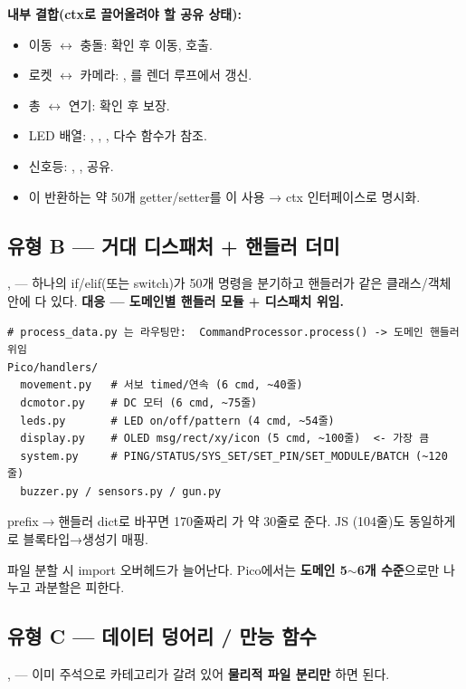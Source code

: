 \noindent\textbf{내부 결합(ctx로 끌어올려야 할 공유 상태):}
\begin{itemize}
  \item 이동 $\leftrightarrow$ 충돌:  확인 후 이동,  호출.
  \item 로켓 $\leftrightarrow$ 카메라: , 를 렌더 루프에서 갱신.
  \item 총 $\leftrightarrow$ 연기:  확인 후  보장.
  \item LED 배열: , , ,  다수 함수가 참조.
  \item 신호등: , ,  공유.
  \item {}이 반환하는 약 50개 getter/setter를 이 사용 → ctx 인터페이스로 명시화.
\end{itemize}

\subsection{유형 B --- 거대 디스패처 + 핸들러 더미}
,  --- 하나의 if/elif(또는
switch)가 50개 명령을 분기하고 핸들러가 같은 클래스/객체 안에 다 있다.
\textbf{대응 --- 도메인별 핸들러 모듈 + 디스패치 위임.}

\begin{verbatim}
# process_data.py 는 라우팅만:  CommandProcessor.process() -> 도메인 핸들러 위임
Pico/handlers/
  movement.py   # 서보 timed/연속 (6 cmd, ~40줄)
  dcmotor.py    # DC 모터 (6 cmd, ~75줄)
  leds.py       # LED on/off/pattern (4 cmd, ~54줄)
  display.py    # OLED msg/rect/xy/icon (5 cmd, ~100줄)  <- 가장 큼
  system.py     # PING/STATUS/SYS_SET/SET_PIN/SET_MODULE/BATCH (~120줄)
  buzzer.py / sensors.py / gun.py
\end{verbatim}

\noindent prefix$\to$핸들러 dict로 바꾸면 170줄짜리 가 약 30줄로 준다.
JS (104줄)도 동일하게 로 블록타입→생성기 매핑.

\begin{notebox}
파일 분할 시 import 오버헤드가 늘어난다. Pico에서는 \textbf{도메인 5$\sim$6개
수준}으로만 나누고 과분할은 피한다.
\end{notebox}

\subsection{유형 C --- 데이터 덩어리 / 만능 함수}
,  --- 이미 주석으로 카테고리가
갈려 있어 \textbf{물리적 파일 분리만} 하면 된다.

